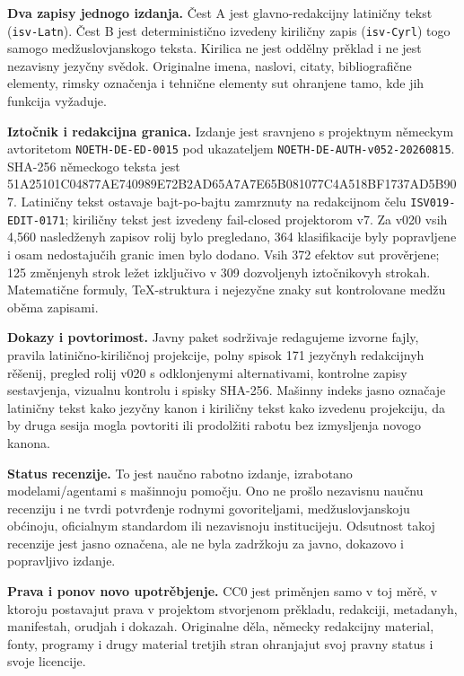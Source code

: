 \documentclass[11pt]{article}
\newcommand{\smallhash}[1]{{\ttfamily\footnotesize #1}}
\begin{document}
\textbf{Dva zapisy jednogo izdanja.} Čest A jest glavno-redakcijny latiničny tekst (\texttt{isv-Latn}). Čest B jest deterministično izvedeny kiriličny zapis (\texttt{isv-Cyrl}) togo samogo medžuslovjanskogo teksta. Kirilica ne jest oddělny prěklad i ne jest nezavisny jezyčny svědok. Originalne imena, naslovi, citaty, bibliografične elementy, rimsky označenja i tehnične elementy sut ohranjene tamo, kde jih funkcija vyžaduje.

\textbf{Iztočnik i redakcijna granica.} Izdanje jest sravnjeno s projektnym německym avtoritetom \texttt{NOETH-DE-ED-0015} pod ukazateljem \texttt{NOETH-DE-AUTH-v052-20260815}. SHA-256 německogo teksta jest
\smallhash{51A25101C04877AE740989E72B2AD65A7A7E65B081077C4A518BF1737AD5B907}.
Latiničny tekst ostavaje bajt-po-bajtu zamrznuty na redakcijnom čelu \texttt{ISV019-EDIT-0171}; kiriličny tekst jest izvedeny fail-closed projektorom v7. Za v020 vsih 4,560 nasledženyh zapisov rolij bylo pregledano, 364 klasifikacije byly popravljene i osam nedostajučih granic imen bylo dodano. Vsih 372 efektov sut prověrjene; 125 změnjenyh strok ležet izključivo v 309 dozvoljenyh iztočnikovyh strokah. Matematične formuly, TeX-struktura i nejezyčne znaky sut kontrolovane medžu oběma zapisami.

\textbf{Dokazy i povtorimost.} Javny paket sodrživaje redagujeme izvorne fajly, pravila latinično-kiriličnoj projekcije, polny spisok 171 jezyčnyh redakcijnyh rěšenij, pregled rolij v020 s odklonjenymi alternativami, kontrolne zapisy sestavjenja, vizualnu kontrolu i spisky SHA-256. Mašinny indeks jasno označaje latiničny tekst kako jezyčny kanon i kiriličny tekst kako izvedenu projekciju, da by druga sesija mogla povtoriti ili prodolžiti rabotu bez izmysljenja novogo kanona.

\textbf{Status recenzije.} To jest naučno rabotno izdanje, izrabotano modelami/agentami s mašinnoju pomočju. Ono ne prošlo nezavisnu naučnu recenziju i ne tvrdi potvrđenje rodnymi govoriteljami, medžuslovjanskoju obćinoju, oficialnym standardom ili nezavisnoju institucijeju. Odsutnost takoj recenzije jest jasno označena, ale ne byla zadržkoju za javno, dokazovo i popravljivo izdanje.

\textbf{Prava i ponov novo upotrěbjenje.} CC0 jest priměnjen samo v toj měrě, v ktoroju postavajut prava v projektom stvorjenom prěkladu, redakciji, metadanyh, manifestah, orudjah i dokazah. Originalne děla, německy redakcijny material, fonty, programy i drugy material tretjih stran ohranjajut svoj pravny status i svoje licencije.
\end{document}
